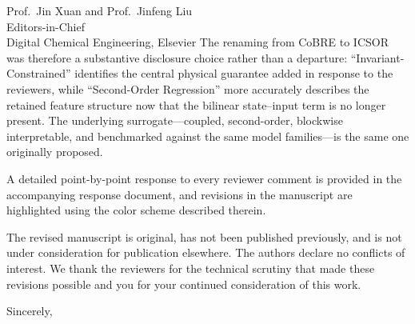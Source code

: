 \documentclass[11pt,a4paper]{letter}
\begin{document}
\begin{letter}{Prof.\ Jin Xuan and Prof.\ Jinfeng Liu \\ Editors-in-Chief \\ Digital Chemical Engineering, Elsevier}
The renaming from CoBRE to ICSOR was therefore a substantive disclosure choice rather than a departure: ``Invariant-Constrained'' identifies the central physical guarantee added in response to the reviewers, while ``Second-Order Regression'' more accurately describes the retained feature structure now that the bilinear state--input term is no longer present. The underlying surrogate---coupled, second-order, blockwise interpretable, and benchmarked against the same model families---is the same one originally proposed.

A detailed point-by-point response to every reviewer comment is provided in the accompanying response document, and revisions in the manuscript are highlighted using the color scheme described therein.

The revised manuscript is original, has not been published previously, and is not under consideration for publication elsewhere. The authors declare no conflicts of interest. We thank the reviewers for the technical scrutiny that made these revisions possible and you for your continued consideration of this work.

\closing{Sincerely,}

\end{letter}
\end{document}
